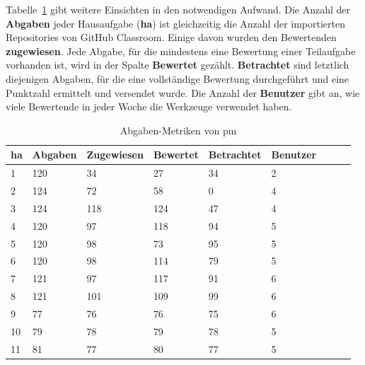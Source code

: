 
\renewcommand{\thefootnote}{\arabic{footnote}}

Tabelle~\ref{tbl:pm-solutions} gibt weitere Einsichten in den notwendigen Aufwand.
Die Anzahl der \textbf{Abgaben} jeder Hausaufgabe (\textbf{\acs{ha}}) ist gleichzeitig die Anzahl der importierten Repositories von GitHub Classroom.
Einige davon wurden den Bewertenden \textbf{zugewiesen}.
Jede Abgabe, für die mindestens eine Bewertung einer Teilaufgabe vorhanden ist, wird in der Spalte \textbf{Bewertet} gezählt.
\textbf{Betrachtet} sind letztlich diejenigen Abgaben, für die eine vollständige Bewertung durchgeführt und eine Punktzahl ermittelt und versendet wurde.
Die Anzahl der \textbf{Benutzer} gibt an, wie viele Bewertende in jeder Woche die Werkzeuge verwendet haben.

\begin{table}
    \centering
    \caption{Abgaben-Metriken von \ac{pm}}
    \begin{tabular}{|l|l|l|l|l|l|l|l|l|}
    \hline
        \acs{ha} & Abgaben & Zugewiesen & Bewertet & Betrachtet & Benutzer \\ \hline
        1  & 120 &  34 &  27 & 34 & 2  \\ \hline
        2  & 124 &  72 &  58 &  0 & 4  \\ \hline
        3  & 124 & 118 & 124 & 47 & 4  \\ \hline
        4  & 120 &  97 & 118 & 94 & 5  \\ \hline
        5  & 120 &  98 &  73 & 95 & 5  \\ \hline
        6  & 120 &  98 & 114 & 79 & 5  \\ \hline
        7  & 121 &  97 & 117 & 91 & 6  \\ \hline
        8  & 121 & 101 & 109 & 99 & 6  \\ \hline
        9  &  77 &  76 &  76 & 75 & 6  \\ \hline
        10 &  79 &  78 &  79 & 78 & 5  \\ \hline
        11 &  81 &  77 &  80 & 77 & 5  \\ \hline
    \end{tabular}
    \label{tbl:pm-solutions}
\end{table}


